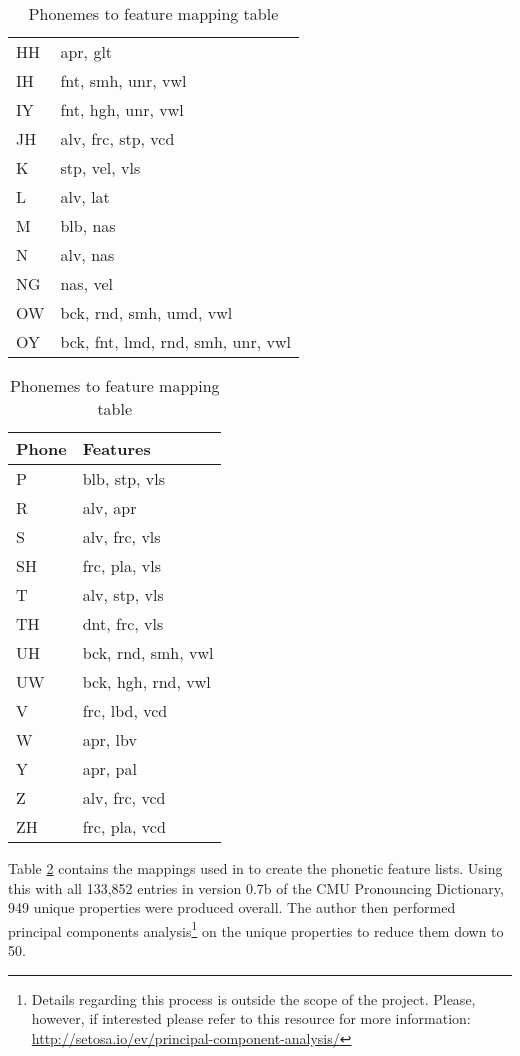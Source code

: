 \begin{table}[!htb]
\begin{minipage}{.33\linewidth}
\begin{tabular}{ll}
            HH & apr, glt \\
            IH & fnt, smh, unr, vwl \\
            IY & fnt, hgh, unr, vwl \\
            JH & alv, frc, stp, vcd \\
            K &  stp, vel, vls \\
            L &  alv, lat \\
            M &  blb, nas \\
            N &  alv, nas \\
            NG & nas, vel \\
            OW & bck, rnd, smh, umd, vwl \\
            OY & bck, fnt, lmd, rnd, smh, unr, vwl
        \end{tabular}
    \end{minipage} 
    \begin{minipage}{.33\linewidth}
        \centering
        \begin{tabular}{ll}
            Phone & Features \\
            \hline
            P & blb, stp, vls \\
            R & alv, apr \\
            S & alv, frc, vls \\
            SH & frc, pla, vls \\
            T & alv, stp, vls \\
            TH & dnt, frc, vls \\
            UH & bck, rnd, smh, vwl \\
            UW & bck, hgh, rnd, vwl \\
            V & frc, lbd, vcd \\
            W & apr, lbv \\
            Y & apr, pal \\
            Z & alv, frc, vcd \\
            ZH & frc, pla, vcd \\
        \end{tabular}
    \end{minipage} 
    \caption{Phonemes to feature mapping table}
    \label{tab:features}
\end{table}

Table \ref{tab:features} contains the mappings used in \cite{parrish2017poetic} to create the phonetic feature lists.
Using this with all 133,852 entries in version 0.7b of the CMU Pronouncing Dictionary, 949 unique properties were produced overall. The author then performed principal components analysis\footnote{Details regarding this process is outside the scope of the project. Please, however, if interested please refer to this resource for more information: \url{http://setosa.io/ev/principal-component-analysis/}} on the unique properties to reduce them down to 50.


